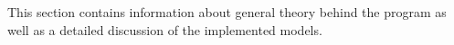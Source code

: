 \setcounter{figure}{0}
\setcounter{table}{0}
\setcounter{equation}{0}

This section contains information about general theory behind the program as well as a detailed discussion of the implemented models.
